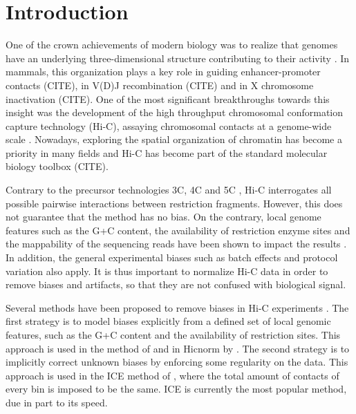 \documentclass{bioinfo}
\begin{document}
\maketitle






\section{Introduction}

One of the crown achievements of modern biology was to realize that
genomes have an underlying three-dimensional structure contributing to
their activity \citep{rowley2016three}. In mammals, this organization
plays a key role in guiding enhancer-promoter contacts (CITE), in V(D)J
recombination (CITE) and in X chromosome inactivation (CITE). One of the
most significant breakthroughs towards this insight was the development of
the high throughput chromosomal conformation capture technology (Hi-C),
assaying chromosomal contacts at a genome-wide scale
\citep{lieberman2009comprehensive}. Nowadays, exploring the spatial
organization of chromatin has become a priority in many fields and
Hi-C has become part of the standard molecular biology toolbox (CITE).

Contrary to the precursor technologies 3C, 4C and 5C \citep{de2012decade},
Hi-C interrogates all possible pairwise interactions between restriction
fragments. However, this does not guarantee that the method has no bias.
On the contrary, local genome features such as the G+C content, the
availability of restriction enzyme sites and the mappability of the
sequencing reads have been shown to impact the results
\citep{yaffe2011probabilistic}. In addition, the general experimental
biases such as batch effects and protocol variation also apply. It is thus
important to normalize Hi-C data in order to remove biases and artifacts,
so that they are not confused with biological signal.

Several methods have been proposed to remove biases in Hi-C experiments
\citep{schmitt2016genome}. The first strategy is to model biases
explicitly from a defined set of local genomic features, such as the G+C
content and the availability of restriction sites. This approach is used
in the method of \cite{yaffe2011probabilistic} and in Hicnorm by
\cite{hu2012hicnorm}. The second strategy is to implicitly correct
unknown biases by enforcing some regularity on the data. This approach is
used in the ICE method of \cite{imakaev2012iterative}, where the total
amount of contacts of every bin is imposed to be the same. ICE is
currently the most popular method, due in part to its speed.
\end{document}
